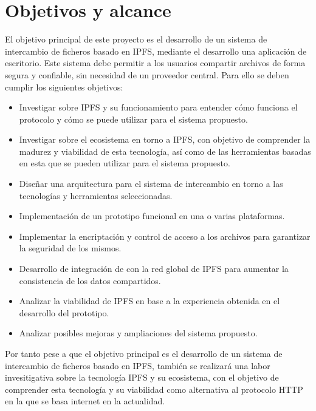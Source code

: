 \section{Objetivos y alcance}
El objetivo principal de este proyecto es el desarrollo de un sistema de intercambio de ficheros basado en IPFS, mediante el desarrollo una aplicación de escritorio. Este sistema debe permitir a los usuarios compartir archivos de forma segura y confiable, sin necesidad de un proveedor central.
Para ello se deben cumplir los siguientes objetivos:
\begin{itemize}

      \item Investigar sobre IPFS y su funcionamiento para entender cómo funciona el protocolo
            y cómo se puede utilizar para el sistema propuesto.
      \item Investigar sobre el ecosistema en torno a IPFS, con objetivo de comprender
            la madurez y viabilidad de esta tecnología, así como de las herramientas basadas en esta
            que se pueden utilizar para el sistema propuesto.
      \item Diseñar una arquitectura para el sistema de intercambio en torno a las tecnologías y herramientas seleccionadas.
      \item Implementación de un prototipo funcional en una o varias plataformas.
      \item Implementar la encriptación y control de acceso a los archivos para garantizar la
            seguridad de los mismos.
      \item Desarrollo de integración de con la red global de IPFS para
            aumentar la consistencia de los datos compartidos.
      \item Analizar la viabilidad de IPFS en base a la experiencia obtenida en el desarrollo
            del prototipo.
      \item Analizar posibles mejoras y ampliaciones del sistema propuesto.

\end{itemize}

Por tanto pese a que el objetivo principal es el desarrollo de un sistema de intercambio de ficheros basado en IPFS,
también se realizará una labor invesitigativa sobre la tecnología IPFS y su ecosistema, con el objetivo de comprender esta tecnología
y su viabilidad como alternativa al protocolo HTTP en la que se basa internet en la actualidad.

